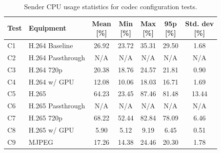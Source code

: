 \begin{table}[H]
    \centering
    \caption{Sender CPU usage statistics for codec configuration tests.}\label{tab:cpu_codec}
    \begin{tabular}{|l|l|c|c|c|c|c|}
    \hline
    \textbf{Test} & \textbf{Equipment} & \shortstack{\textbf{Mean}\\ \textbf{[\%]}} & \shortstack{\textbf{Min}\\ \textbf{[\%]}} & \shortstack{\textbf{Max}\\ \textbf{[\%]}} & \shortstack{\textbf{95p}\\ \textbf{[\%]}} & \shortstack{\textbf{Std. dev}\\ \textbf{[\%]}}\\
    \hline
    C1 & H.264 Baseline & 26.92 & 23.72 & 35.31 & 29.50 & 1.68\\
    \hline
    C2 & H.264 Passthrough & N/A & N/A & N/A & N/A & N/A\\
    \hline
    C3 & H.264 720p & 20.38 & 18.76 & 24.57 & 21.81 & 0.90\\
    \hline
    C4 & H.264 w/ GPU & 12.08 & 10.06 & 18.03 & 16.71 & 1.69\\
    \hline
    C5 & H.265 & 64.23 & 23.45 & 87.46 & 81.48 & 13.44\\
    \hline
    C6 & H.265 Passthrough & N/A & N/A & N/A & N/A & N/A\\
    \hline
    C7 & H.265 720p & 68.22 & 52.44 & 82.84 & 78.09 & 6.46\\
    \hline
    C8 & H.265 w/ GPU & 5.90 & 5.12 & 9.19 & 6.45 & 0.51\\
    \hline
    C9 & MJPEG & 17.26 & 14.38 & 24.46 & 20.30 & 1.78\\
    \hline
    \end{tabular}
\end{table}
